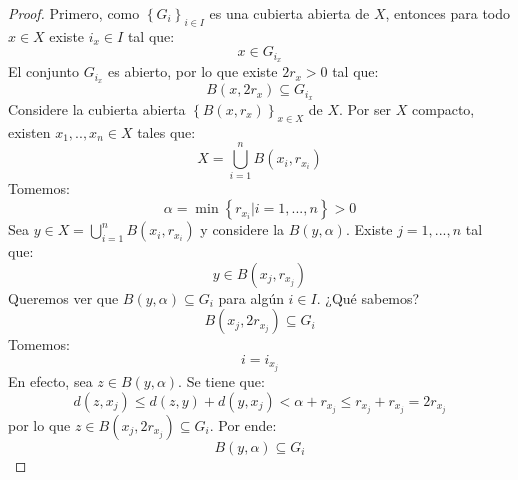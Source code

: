 \documentclass[12pt]{report}
\theoremstyle{largebreak}
\begin{document}
    \begin{proof}
        Primero, como $\left\{G_i \right\}_{ i\in I}$ es una cubierta abierta de $X$, entonces para todo $x\in X$ existe $i_x\in I$ tal que:
        \begin{equation*}
            x\in G_{i_x}
        \end{equation*}
        El conjunto $G_{ i_x}$ es abierto, por lo que existe $2r_x>0$ tal que:
        \begin{equation*}
            B(x,2r_x)\subseteq G_{ i_x}
        \end{equation*}
        Considere la cubierta abierta $\left\{B(x,r_x) \right\}_{ x\in X}$ de $X$. Por ser $X$ compacto, existen $x_1,..,x_n\in X$ tales que:
        \begin{equation*}
            X=\bigcup_{ i=1}^n B(x_i,r_{x_i})
        \end{equation*}
        Tomemos:
        \begin{equation*}
            \alpha=\min\left\{r_{ x_i}\Big|i=1,...,n \right\}>0
        \end{equation*}
        Sea $y\in X=\bigcup_{ i=1}^n B(x_i,r_{x_i})$ y considere la $B(y,\alpha)$. Existe $j=1,...,n$ tal que:
        \begin{equation*}
            y\in B(x_{j},r_{x_{j}})
        \end{equation*}
        Queremos ver que $B(y,\alpha)\subseteq G_{i}$ para algún $i\in I$. ¿Qué sabemos?
        \begin{equation*}
            B(x_j,2r_{ x_j})\subseteq G_{i}
        \end{equation*}
        Tomemos:
        \begin{equation*}
            i=i_{x_j}
        \end{equation*}
        En efecto, sea $z\in B(y,\alpha)$. Se tiene que:
        \begin{equation*}
            d(z,x_j)\leq d(z,y)+d(y,x_j)<\alpha+r_{ x_j}\leq r_{ x_j}+r_{ x_j}=2r_{ x_j}
        \end{equation*}
        por lo que $z\in B(x_j,2r_{ x_j})\subseteq G_i$. Por ende:
        \begin{equation*}
            B(y,\alpha)\subseteq G_i
        \end{equation*}
    \end{proof}
\end{document}
